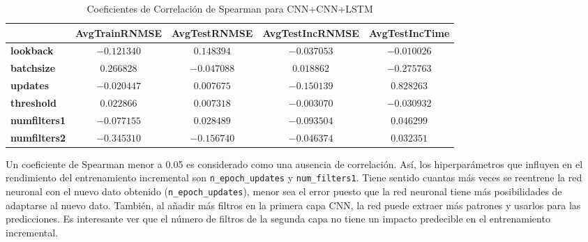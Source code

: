 \documentclass{article}
\begin{document}
\begin{table}[htpb]
	\centering
	\caption{Coeficientes de Correlación de Spearman para CNN+CNN+LSTM}
	\label{tab:spearman_corr}
	\begin{tabular}{|l|c|c|c|c|}
		\hline
		  & \textbf{AvgTrainRNMSE} & \textbf{AvgTestRNMSE} & \textbf{AvgTestIncRNMSE} & \textbf{AvgTestIncTime} \\ \hline
		\textbf{lookback}       & $-0.121340$            & $0.148394$            & $-0.037053$              & $-0.010026$             \\ \hline
		\textbf{batchsize}      & $0.266828$             & $-0.047088$           & $0.018862$               & $-0.275763$             \\ \hline
		\textbf{updates}        & $-0.020447$            & $0.007675$            & $-0.150139$              & $0.828263$              \\ \hline
		\textbf{threshold}      & $0.022866$             & $0.007318$            & $-0.003070$              & $-0.030932$             \\ \hline
		\textbf{numfilters1}    & $-0.077155$            & $0.028489$            & $-0.093504$              & $0.046299$              \\ \hline
		\textbf{numfilters2}    & $-0.345310$            & $-0.156740$           & $-0.046374$              & $0.032351$              \\ \hline
	\end{tabular}
\end{table}

Un coeficiente de Spearman menor a 0.05 es considerado como una ausencia de correlación. Así, los hiperparámetros que influyen en el rendimiento del entrenamiento incremental son \texttt{n\_epoch\_updates} y \texttt{num\_filters1}. Tiene sentido cuantas más veces se reentrene la red neuronal con el nuevo dato obtenido (\texttt{n\_epoch\_updates}), menor sea el error puesto que la red neuronal tiene más posibilidades de adaptarse al nuevo dato. También, al añadir más filtros en la primera capa CNN, la red puede extraer más patrones y usarlos para las predicciones. Es interesante ver que el número de filtros de la segunda capa no tiene un impacto predecible en el entrenamiento incremental.
\end{document}

